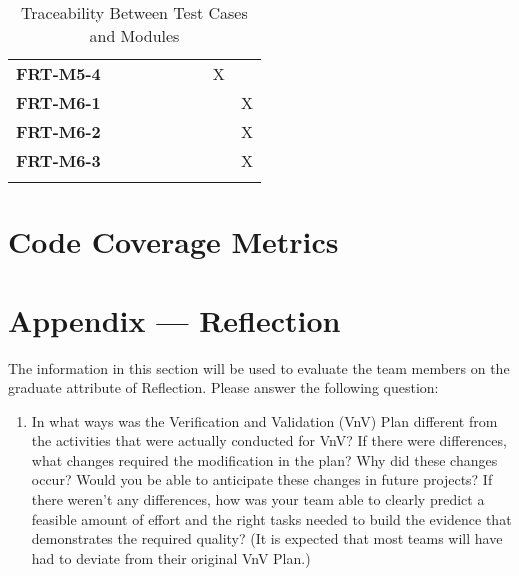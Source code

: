 \documentclass[12pt, titlepage]{article}
\begin{document}
\begin{longtable}{|l|cccccc|}
	\textbf{FRT-M5-4} & ~           & ~           & ~           & ~           & X           & ~           \\
	\textbf{FRT-M6-1} & ~           & ~           & ~           & ~           & ~           & X           \\
	\textbf{FRT-M6-2} & ~           & ~           & ~           & ~           & ~           & X           \\
	\textbf{FRT-M6-3} & ~           & ~           & ~           & ~           & ~           & X           \\
	\hline
\caption{Traceability Between Test Cases and Modules}
\end{longtable}

\newpage

\section{Code Coverage Metrics}




\newpage{}
\section*{Appendix --- Reflection}

The information in this section will be used to evaluate the team members on the
graduate attribute of Reflection.  Please answer the following question:

\begin{enumerate}
  \item In what ways was the Verification and Validation (VnV) Plan different
  from the activities that were actually conducted for VnV?  If there were
  differences, what changes required the modification in the plan?  Why did
  these changes occur?  Would you be able to anticipate these changes in future
  projects?  If there weren't any differences, how was your team able to clearly
  predict a feasible amount of effort and the right tasks needed to build the
  evidence that demonstrates the required quality?  (It is expected that most
  teams will have had to deviate from their original VnV Plan.)
\end{enumerate}
\end{document}
